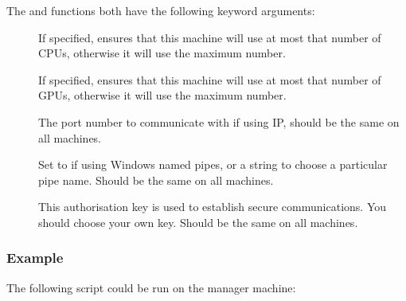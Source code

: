 \documentclass[letterpaper,10pt,english]{manual}
\begin{document}
The \hyperlink{brian.library.modelfitting.modelfitting}{} and \hyperlink{brian.library.modelfitting.modelfitting_worker}{} functions both have
the following keyword arguments:
\begin{description}
\item[] \leavevmode
If specified, ensures that this machine will use at most that number of
CPUs, otherwise it will use the maximum number.

\item[] \leavevmode
If specified, ensures that this machine will use at most that number of
GPUs, otherwise it will use the maximum number.

\item[] \leavevmode
The port number to communicate with if using IP, should be the same on
all machines.

\item[] \leavevmode
Set to  if using Windows named pipes, or a string to choose a
particular pipe name. Should be the same on all machines.

\item[] \leavevmode
This authorisation key is used to establish secure communications. You
should choose your own key. Should be the same on all machines.

\end{description}


\subsubsection{Example}

The following script could be run on the manager machine:
\end{document}
